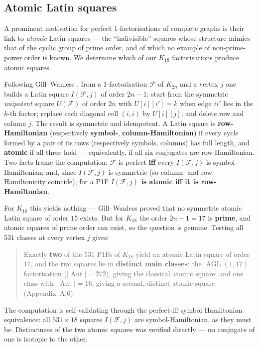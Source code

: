 \documentclass[11pt,reqno]{amsart}
\theoremstyle{plain}
\theoremstyle{definition}
\numberwithin{theorem}{section}
\newcommand{\Aut}{\operatorname{Aut}}
\newcommand{\AGL}{\operatorname{AGL}}
\begin{document}
\subsection{Atomic Latin squares}

A prominent motivation for perfect 1-factorisations of complete graphs is their link to
\emph{atomic} Latin squares --- the ``indivisible'' squares whose structure mimics that of
the cyclic group of prime order, and of which no example of non-prime-power order is known.
We determine which of our $K_{18}$ factorisations produce atomic squares.

Following Gill--Wanless \cite{GillWanless}, from a 1-factorisation $\mathcal F$ of $K_{2n}$
and a vertex $j$ one builds a Latin square $I(\mathcal F,j)$ of order $2n-1$: start from the
symmetric \emph{unipotent} square $U(\mathcal F)$ of order $2n$ with $U[i][i']=k$ when edge
$ii'$ lies in the $k$-th factor; replace each diagonal cell $(i,i)$ by $U[i][j]$; and delete
row and column $j$. The result is symmetric and idempotent. A Latin square is
\textbf{row-Hamiltonian} (respectively \textbf{symbol-}, \textbf{column-Hamiltonian}) if
every cycle formed by a pair of its rows (respectively symbols, columns) has full length,
and \textbf{atomic} if all three hold --- equivalently, if all six conjugates are
row-Hamiltonian. Two facts frame the computation: $\mathcal F$ is perfect \textbf{iff} every
$I(\mathcal F,j)$ is symbol-Hamiltonian; and, since $I(\mathcal F,j)$ is symmetric (so column-
and row-Hamiltonicity coincide), for a P1F \textbf{$I(\mathcal F,j)$ is atomic iff it is
row-Hamiltonian}.

For $K_{16}$ this yields nothing --- Gill--Wanless proved that no symmetric atomic Latin
square of order $15$ exists. But for $K_{18}$ the order $2n-1=17$ is \textbf{prime}, and
atomic squares of prime order can exist, so the question is genuine. Testing all $531$
classes at every vertex $j$ gives:

\begin{quote}
Exactly \textbf{two} of the $531$ P1Fs of $K_{18}$ yield an atomic Latin square of order
$17$, and the two squares lie in \textbf{distinct main classes}: the $\AGL(1,17)$
factorisation ($|\Aut|=272$), giving the classical atomic square; and one class with
$|\Aut|=16$, giving a second, distinct atomic square (Appendix~A.6).
\end{quote}

The computation is self-validating through the perfect-iff-symbol-Hamiltonian equivalence:
all $531\times 18$ squares $I(\mathcal F,j)$ are symbol-Hamiltonian, as they must be.
Distinctness of the two atomic squares was verified directly --- no conjugate of one is
isotopic to the other.
\end{document}
